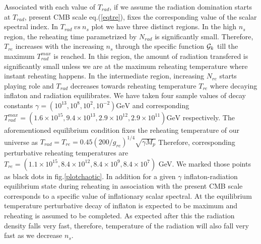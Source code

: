 \documentclass[prl,twocolumn,superscriptaddress,doublespace]{revtex4}%
\begin{document}
 Associated with each value of $T_{rad}$,
if we assume the radiation domination starts at $T_{rad}$, present CMB scale eq.(\ref{eqtre}), 
fixes the corresponding value of the scalar spectral index. In $T_{rad}~vs~n_s$ plot we have three distinct regions. In the high $n_s$ region, the reheating time parametrized by $N_{rad}$ is significantly small. Therefore, $T_{re}$ increases with the increasing $n_s$ through the specific function ${\cal G}_k$ till the maximum $T^{max}_{rad}$  is reached. In this region, the amount of radiation transfered is significantly small unless we are at the maximum reheating temperature where instant reheating happens. 
 In the intermediate region, increasing $N_{re}$ starts playing role and $T_{rad}$ decreases towards reheating temperature $T_{re}$ where decaying inflaton and radiation  equilibrates. 
We have taken four sample values of decay constants $\gamma = (10^{13},10^8, 10^2, 10^{-2}) \mbox{GeV}$ and corresponding  $T^{max}_{rad}= (1.6\times 10^{15},9.4 \times 10^{13},2.9 \times 10^{12}, 2.9 \times 10^{11}) \mbox{GeV}$ respectively. The aforementioned equilibrium condition fixes the reheating temperature of our universe as $T_{rad} =T_{re}= 0.45 \left({200}/{g_{re}}\right)^{1/4}\sqrt{\gamma M_p}$
Therefore, corresponding perturbative reheating temperatures are $T_{re} =(1.1\times 10^{15},8.4\times10^{12},8.4\times10^{9},8.4\times10^{7})$ GeV. We marked those points as black dots in fig.\ref{plotchaotic}.
In addition for a given $\gamma$ inflaton-radiation equilibrium state during reheating in association with the present CMB scale corresponds to a specific value of inflationary scalar spectral. At the equilibrium temperature perturbative decay of inflaton is expected to be maximum and reheating is assumed to be completed. As expected after this the radiation density falls very fast, therefore, temperature of the radiation will also fall very fast as we decrease $n_s$.  
 
\end{document}
